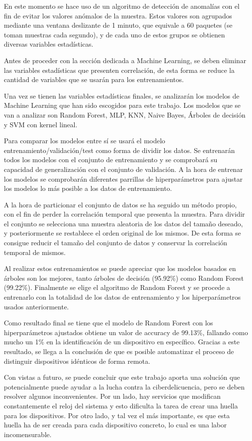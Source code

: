 En este momento se hace uso de un algoritmo de detección de anomalías con el fin de evitar los valores anómalos de la muestra. Estos valores son agrupados mediante una ventana deslizante de 1 minuto, que equivale a 60 paquetes (se toman muestras cada segundo), y de cada uno de estos grupos se obtienen diversas variables estadísticas.

Antes de proceder con la sección dedicada a Machine Learning, se deben eliminar las variables estadísticas que presenten correlación, de esta forma se reduce la cantidad de variables que se usarán para los entrenamientos.

Una vez se tienen las variables estadísticas finales, se analizarán los modelos de Machine Learning que han sido escogidos para este trabajo. Los modelos que se van a analizar son Random Forest, MLP, KNN, Naive Bayes, Árboles de decisión y SVM con kernel lineal. 

Para comparar los modelos entre sí se usará el modelo entrenamiento/validación/test como forma de dividir los datos. Se entrenarán todos los modelos con el conjunto de entrenamiento y se comprobará su capacidad de generalización con el conjunto de validación. A la hora de entrenar los modelos se comprobarán diferentes parrillas de hiperparámetros para ajustar los modelos lo más posible a los datos de entrenamiento.

A la hora de particionar el conjunto de datos se ha seguido un método propio, con el fin de perder la correlación temporal que presenta la muestra. Para dividir el conjunto se selecciona una muestra aleatoria de los datos del tamaño deseado, y posteriormente se restablece el orden original de los mismos. De esta forma se consigue reducir el tamaño del conjunto de datos y conservar la correlación temporal de mismos.

Al realizar estos entrenamientos se puede apreciar que los modelos basados en árboles son los mejores, tanto árboles de decisión (95.92\%) como Random Forest (99.22\%). Finalmente se elige el algoritmo de Random Forest y se procede a entrenarlo con la totalidad de los datos de entrenamiento y los hiperparámetros usados anteriormente. 

Como resultado final se tiene que el modelo de Random Forest con los hiperparámetros ajustados obtiene un valor de accuracy de 99.13\%, fallando como mucho un 1\% en la identificación de un dispositivo en específico. Gracias a este resultado, se llega a la conclusión de que es posible automatizar el proceso de distinguir dispositivos idénticos de forma remota.

Con vistas a futuro, se puede concluir que este trabajo aporta una solución que potencialmente puede ayudar a la lucha contra la ciberdelicuencia, pero se deben resolver algunos inconvenientes. Por un lado, hay servicios que modifican constantemente el reloj del sistema y esto dificulta la tarea de crear una huella para los dispositivos. Por otro lado, y tal vez el más importante, es que esta huella ha de ser creada para cada dispositivo concreto, lo cual es una labor incomensurable.

